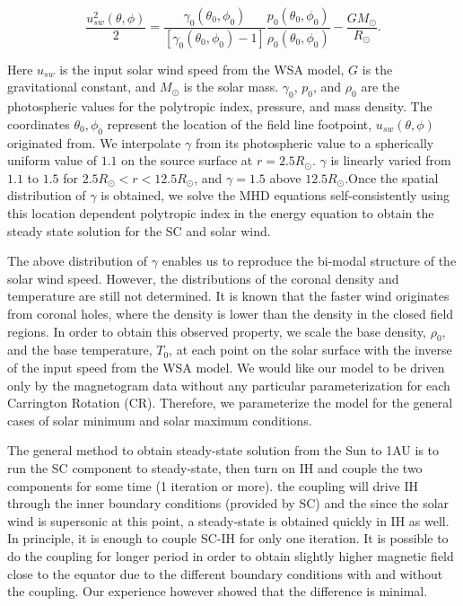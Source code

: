 \begin{equation}
\label{eq:Bernoulli2}
\frac{u_{sw}^2(\theta,\phi)}{2}=\frac{\gamma_0(\theta_0,\phi_0) }
{[\gamma_0(\theta_0,\phi_0)-1]}
\frac{p_0(\theta_0,\phi_0)}{\rho_0(\theta_0,\phi_0)}-\frac{GM_\odot}{R_\odot}.
\end{equation}

Here $u_{sw}$ is the input solar wind speed from the WSA model, $G$ is the 
gravitational constant, and $M_\odot$ is the solar mass. $\gamma_0$, $p_0$, 
and $\rho_0$ are the photospheric values for the polytropic index, pressure, 
and  mass density. The coordinates $\theta_0,\phi_0$ represent the location 
of the field line footpoint, $u_{sw}(\theta,\phi)$ originated from. We 
interpolate $\gamma$ from its photospheric value to a spherically uniform 
value of $1.1$ on the source surface at $r=2.5R_\odot$. $\gamma$ is linearly 
varied from $1.1$ to $1.5$ for $2.5R_\odot < r < 12.5R_\odot$, and 
$\gamma=1.5$ above $12.5R_\odot$.Once the spatial distribution of $\gamma$ 
is obtained, we solve the MHD equations self-consistently using this location 
dependent polytropic index in the energy equation to obtain the steady state 
solution for the SC and solar wind.

The above distribution of $\gamma$ enables us to reproduce the bi-modal 
structure of the solar wind speed. However, the distributions of the coronal 
density and temperature are still not determined. It is known that the faster 
wind originates from coronal holes, where the density is lower than the 
density in the closed field regions. In order to obtain this observed 
property, we scale the base density, $\rho_0$, and the base temperature, 
$T_0$, at each point on the solar surface with the inverse of the input 
speed from the WSA model. We would like our model to be driven only by the 
magnetogram data without any particular parameterization for each Carrington 
Rotation (CR). Therefore, we parameterize the model for the general cases of 
solar minimum and solar maximum conditions.

The general method to obtain steady-state solution from the Sun to 1AU is to 
run the SC component to steady-state, then turn on IH and couple the two 
components for some time (1 iteration or more). the coupling will drive IH 
through the inner boundary conditions (provided by SC) and the since the 
solar wind is supersonic at this point, a steady-state is obtained quickly 
in IH as well. In principle, it is enough to couple SC-IH for only one 
iteration. It is possible to do the coupling for longer period in order to 
obtain slightly higher magnetic field close to the equator due to the 
different boundary conditions with and without the coupling. Our experience 
however showed that the difference is minimal. 

